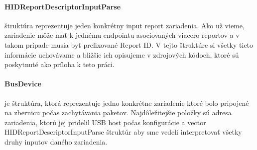 \paragraph{HIDReportDescriptorInputParse}\label{kap04:sec:hid_report_input_parse} štruktúra reprezentuje jeden konkrétny input report zariadenia. Ako už vieme, zariadenie môže mať k jednému endpointu asociovaných viacero reportov a v takom prípade musia byť prefixované Report ID. V tejto štruktúre si všetky tieto informácie uchovávame a bližšie ich opisujeme v zdrojových kódoch, ktoré sú poskytnuté ako príloha k teto práci.

\paragraph{BusDevice}\label{kap04:sec:bus_device} je štruktúra, ktorá reprezentuje jedno konkrétne zariadenie ktoré bolo pripojené na zbernicu počas zachytávania paketov. Najdôležitejšie položky sú adresa zariadenia, ktorú jej pridelil USB host počas konfigurácie a vector HIDReportDescriptorInputParse štruktúr aby sme vedeli interpretovať všetky druhy inputov daného zariadenia.